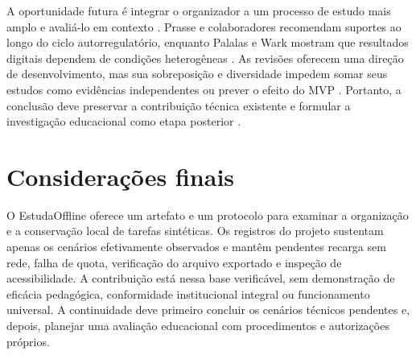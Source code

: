 A oportunidade futura é integrar o organizador a um processo de estudo mais amplo e avaliá-lo em contexto \citep[p. 1809, 1825–1827]{education_prasse2024} \citep[p. 156, 164–165]{education_palalas2020}. Prasse e colaboradores recomendam suportes ao longo do ciclo autorregulatório, enquanto Palalas e Wark mostram que resultados digitais dependem de condições heterogêneas \citep[p. 1809, 1825–1827]{education_prasse2024} \citep[p. 156, 164–165]{education_palalas2020}. As revisões oferecem uma direção de desenvolvimento, mas sua sobreposição e diversidade impedem somar seus estudos como evidências independentes ou prever o efeito do MVP \citep[p. 1809, 1825–1827]{education_prasse2024} \citep[p. 156, 164–165]{education_palalas2020}. Portanto, a conclusão deve preservar a contribuição técnica existente e formular a investigação educacional como etapa posterior \citep[p. 1809, 1825–1827]{education_prasse2024} \citep[p. 156, 164–165]{education_palalas2020}.

\clearpage\section{Considerações finais}

O EstudaOffline oferece um artefato e um protocolo para examinar a organização e a conservação local de tarefas sintéticas. Os registros do projeto sustentam apenas os cenários efetivamente observados e mantêm pendentes recarga sem rede, falha de quota, verificação do arquivo exportado e inspeção de acessibilidade. A contribuição está nessa base verificável, sem demonstração de eficácia pedagógica, conformidade institucional integral ou funcionamento universal. A continuidade deve primeiro concluir os cenários técnicos pendentes e, depois, planejar uma avaliação educacional com procedimentos e autorizações próprios.
